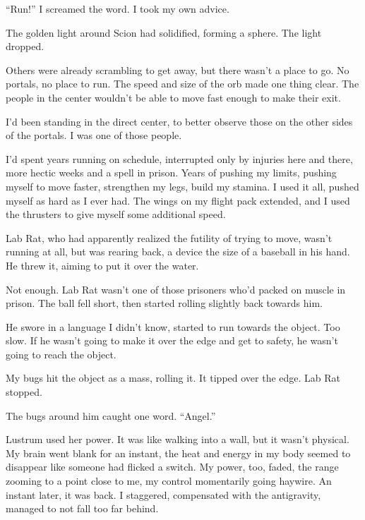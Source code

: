 





``Run!'' I screamed the word.  I took my own advice.



The golden light around Scion had solidified, forming a sphere.  The light dropped.



Others were already scrambling to get away, but there wasn't a place to go.  No portals, no place to run.  The speed and size of the orb made one thing clear.  The people in the center wouldn't be able to move fast enough to make their exit.



I'd been standing in the direct center, to better observe those on the other sides of the portals.  I was one of those people.



I'd spent years running on schedule, interrupted only by injuries here and there, more hectic weeks and a spell in prison.  Years of pushing my limits, pushing myself to move faster, strengthen my legs, build my stamina.  I used it all, pushed myself as hard as I ever had.  The wings on my flight pack extended, and I used the thrusters to give myself some additional speed.



Lab Rat, who had apparently realized the futility of trying to move, wasn't running at all, but was rearing back, a device the size of a baseball in his hand.  He threw it, aiming to put it over the water.



Not enough.  Lab Rat wasn't one of those prisoners who'd packed on muscle in prison.  The ball fell short, then started rolling slightly back towards him.



He swore in a language I didn't know, started to run towards the object.  Too slow.  If he wasn't going to make it over the edge and get to safety, he wasn't going to reach the object.



My bugs hit the object as a mass, rolling it.  It tipped over the edge.  Lab Rat stopped.



The bugs around him caught one word.  ``Angel.''



Lustrum used her power.  It was like walking into a wall, but it wasn't physical.  My brain went blank for an instant, the heat and energy in my body seemed to disappear like someone had flicked a switch.  My power, too, faded, the range zooming to a point close to me, my control momentarily going haywire.  An instant later, it was back.  I staggered, compensated with the antigravity, managed to not fall too far behind.



